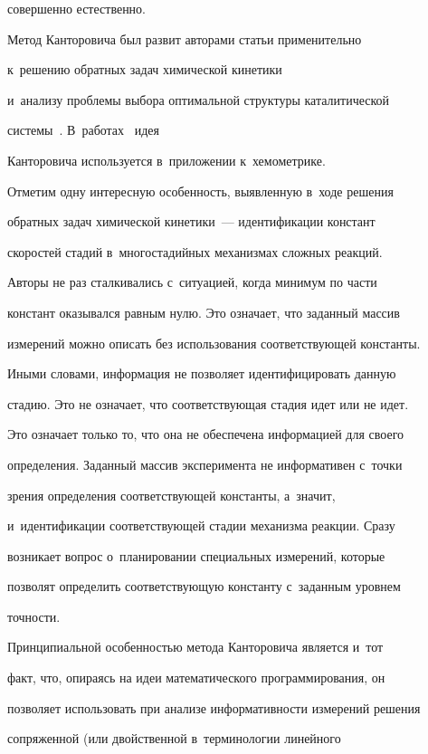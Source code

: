 совершенно естественно.

  

  Метод Канторовича был развит авторами статьи применительно 

к~решению обратных задач химической кинетики~\cite{3-sp, 5-sp, 6-sp} 

и~анализу проблемы выбора оптимальной структуры каталитической 

системы~\cite{7-sp}. В~работах~\cite{8-sp, 9-sp, 10-sp, 11-sp, 12-sp} идея 

Канторовича используется в~приложении к~хемометрике.

  

  Отметим одну интересную особенность, выявленную в~ходе решения 

обратных задач химической кинетики~--- идентификации констант 

скоростей стадий в~многостадийных механизмах сложных реакций. 

Авторы не раз сталкивались с~ситуацией, когда минимум по части 

констант оказывался равным нулю. Это означает, что заданный массив 

измерений можно описать без использования соответствующей константы. 

Иными словами, информация не позволяет идентифицировать данную 

стадию. Это не означает, что соответствующая стадия идет или не идет. 

Это означает только то, что она не обеспечена информацией для своего 

определения. Заданный массив эксперимента не информативен с~точки 

зрения определения соответствующей константы, а~значит, 

и~идентификации соответствующей стадии механизма реакции. Сразу 

возникает вопрос о~планировании специальных измерений, которые 

позволят определить соответствующую константу с~заданным уровнем 

точности.

  

  Принципиальной особенностью метода Канторовича является и~тот 

факт, что, опираясь на идеи математического программирования, он 

позволяет использовать при анализе информативности измерений решения 

сопряженной (или двойственной в~терминологии линейного 

